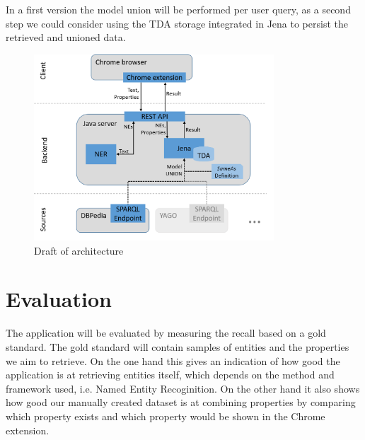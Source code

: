 \documentclass[11pt,titlepage,oneside,openany]{article}
\begin{document}
In a first version the model union will be performed per user query, as a second
step we could consider using the TDA storage integrated in Jena to persist the
retrieved and unioned data.

\begin{figure}[ht]
	\centering
	\includegraphics[width=0.8\textwidth]{architecture}
	\caption{Draft of architecture}
	\label{fig:architecture}
\end{figure}


\section{Evaluation}
The application will be evaluated by measuring the recall based on a gold
standard. The gold standard will contain samples of entities and the properties
we aim to retrieve. On the one hand this gives an indication of how good the
application is at retrieving entities itself, which depends on the method and
framework used, i.e. Named Entity Recoginition. On the other hand it also shows
how good our manually created dataset is at combining properties by comparing
which property exists and which property would be shown in the Chrome extension.
\end{document}
